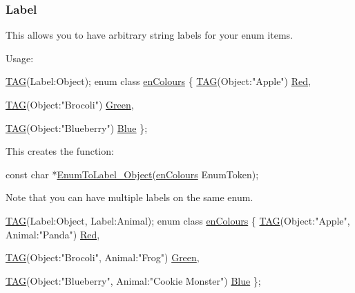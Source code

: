 \subsubsection*{Label}

This allows you to have arbitrary string labels for your enum items.

Usage\+: 
\begin{DoxyCode}
\hyperlink{Generated__001_8h_ad9b15e5b6d9b1ed55b76d9916ff6dec2}{TAG}(Label:Object);
\textcolor{keyword}{enum class} \hyperlink{PreprocTest_8h_a081cf1a0e70d6e2bd48c98f457742877}{enColours}
\{
    \hyperlink{ParsedC_8h_a542930d5f2f117ff1e21206f2baa51c5ae444f73956e5b2a401eb9471db89e7c9}{TAG}(Object:\textcolor{stringliteral}{"Apple"})
    \hyperlink{PreprocTest_8h_a081cf1a0e70d6e2bd48c98f457742877aee38e4d5dd68c4e440825018d549cb47}{Red},

    \hyperlink{ParsedC_8h_a542930d5f2f117ff1e21206f2baa51c5ae444f73956e5b2a401eb9471db89e7c9}{TAG}(Object:\textcolor{stringliteral}{"Brocoli"})
    \hyperlink{PreprocTest_8h_a081cf1a0e70d6e2bd48c98f457742877ad382816a3cbeed082c9e216e7392eed1}{Green},

    \hyperlink{ParsedC_8h_a542930d5f2f117ff1e21206f2baa51c5ae444f73956e5b2a401eb9471db89e7c9}{TAG}(Object:\textcolor{stringliteral}{"Blueberry"})
    \hyperlink{PreprocTest_8h_a081cf1a0e70d6e2bd48c98f457742877a9594eec95be70e7b1710f730fdda33d9}{Blue}
\};
\end{DoxyCode}


This creates the function\+: 
\begin{DoxyCode}
\textcolor{keyword}{const} \textcolor{keywordtype}{char} *\hyperlink{Generated__Test_8h_a9b8638e967a81b3c211b77df49d85034}{EnumToLabel\_Object}(\hyperlink{PreprocTest_8h_a081cf1a0e70d6e2bd48c98f457742877}{enColours} EnumToken);
\end{DoxyCode}


Note that you can have multiple labels on the same enum.


\begin{DoxyCode}
\hyperlink{Generated__001_8h_ad9b15e5b6d9b1ed55b76d9916ff6dec2}{TAG}(Label:Object, Label:Animal);
\textcolor{keyword}{enum class} \hyperlink{PreprocTest_8h_a081cf1a0e70d6e2bd48c98f457742877}{enColours}
\{
    \hyperlink{ParsedC_8h_a542930d5f2f117ff1e21206f2baa51c5ae444f73956e5b2a401eb9471db89e7c9}{TAG}(Object:\textcolor{stringliteral}{"Apple"}, Animal:\textcolor{stringliteral}{"Panda"})
    \hyperlink{PreprocTest_8h_a081cf1a0e70d6e2bd48c98f457742877aee38e4d5dd68c4e440825018d549cb47}{Red},

    \hyperlink{ParsedC_8h_a542930d5f2f117ff1e21206f2baa51c5ae444f73956e5b2a401eb9471db89e7c9}{TAG}(Object:\textcolor{stringliteral}{"Brocoli"}, Animal:\textcolor{stringliteral}{"Frog"})
    \hyperlink{PreprocTest_8h_a081cf1a0e70d6e2bd48c98f457742877ad382816a3cbeed082c9e216e7392eed1}{Green},

    \hyperlink{ParsedC_8h_a542930d5f2f117ff1e21206f2baa51c5ae444f73956e5b2a401eb9471db89e7c9}{TAG}(Object:\textcolor{stringliteral}{"Blueberry"}, Animal:\textcolor{stringliteral}{"Cookie Monster"})
    \hyperlink{PreprocTest_8h_a081cf1a0e70d6e2bd48c98f457742877a9594eec95be70e7b1710f730fdda33d9}{Blue}
\};
\end{DoxyCode}



